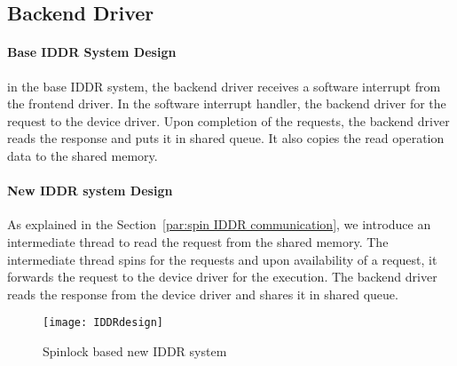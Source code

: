 \subsection{Backend Driver}
\paragraph{Base IDDR System Design}
in the base IDDR system, the backend driver receives a software interrupt from the frontend driver. In the software interrupt handler, the backend driver for the request to the device driver. Upon completion of the requests, the backend driver reads the response and puts it in shared queue. It also copies the read operation data to the shared memory. 

\paragraph{New IDDR system Design}
As explained in the Section~\ref{par:spin IDDR communication}, we introduce an intermediate thread to read the request from the shared memory. The intermediate thread spins for the requests and upon availability of a request, it forwards the request to the device driver for the execution. The backend driver reads the response from the device driver and shares it in shared queue.
\begin{figure}[!ht]
\centering
\texttt{[image: IDDRdesign]}
\caption{Spinlock based new IDDR system}
\label{fig:new IDDR system}
\end{figure}

    
